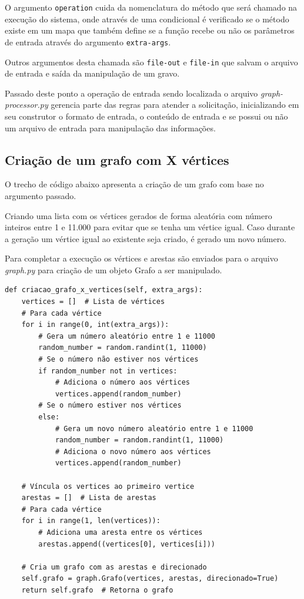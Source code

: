 O argumento \texttt{operation} cuida da nomenclatura do método que será chamado na execução do sistema, onde através de uma condicional é verificado se o método existe em um mapa que também define se a função recebe ou não os parâmetros de entrada através do argumento \texttt{extra-args}.

Outros argumentos desta chamada são \texttt{file-out} e \texttt{file-in} que salvam o arquivo de entrada e saída da manipulação de um gravo.

Passado deste ponto a operação de entrada sendo localizada o arquivo \emph{graph-processor.py} gerencia parte das regras para atender a solicitação, inicializando em seu construtor o formato de entrada, o conteúdo de entrada e se possui ou não um arquivo de entrada para manipulação das informações.

\subsection{\esp Criação de um grafo com X vértices}

O trecho de código abaixo apresenta a criação de um grafo com base no argumento passado.

Criando uma lista com os vértices gerados de forma aleatória com número inteiros entre 1 e 11.000 para evitar que se tenha um vértice igual. Caso durante a geração um vértice igual ao existente seja criado, é gerado um novo número.

Para completar a execução os vértices e arestas são enviados para o arquivo \emph{graph.py} para criação de um objeto Grafo a ser manipulado.

\begin{verbatim}
def criacao_grafo_x_vertices(self, extra_args):
    vertices = []  # Lista de vértices
    # Para cada vértice
    for i in range(0, int(extra_args)):
        # Gera um número aleatório entre 1 e 11000
        random_number = random.randint(1, 11000)
        # Se o número não estiver nos vértices
        if random_number not in vertices:
            # Adiciona o número aos vértices
            vertices.append(random_number)
        # Se o número estiver nos vértices
        else:
            # Gera um novo número aleatório entre 1 e 11000
            random_number = random.randint(1, 11000)
            # Adiciona o novo número aos vértices
            vertices.append(random_number)

    # Víncula os vertices ao primeiro vertice
    arestas = []  # Lista de arestas
    # Para cada vértice
    for i in range(1, len(vertices)):
        # Adiciona uma aresta entre os vértices
        arestas.append((vertices[0], vertices[i]))

    # Cria um grafo com as arestas e direcionado
    self.grafo = graph.Grafo(vertices, arestas, direcionado=True)  
    return self.grafo  # Retorna o grafo
\end{verbatim}

